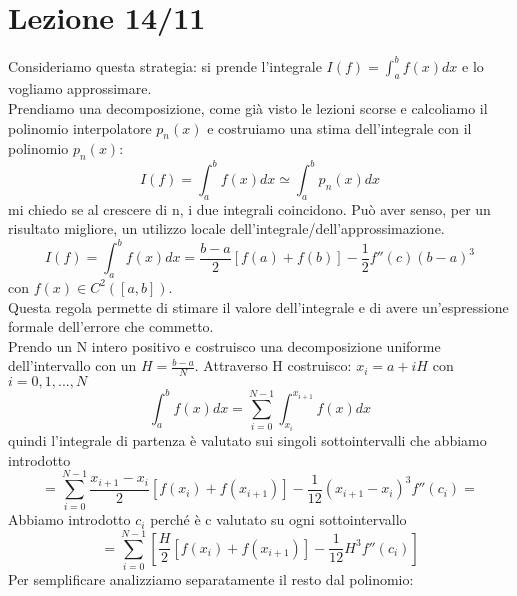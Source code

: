 \documentclass[a4paper, portrait]{book}
\numberwithin{equation}{chapter} %
\begin{document}
\chapter{Lezione 14/11}
Consideriamo questa strategia: si prende l'integrale $I(f) = \int_a^b f(x) dx$ e lo vogliamo approssimare.\\
Prendiamo una decomposizione, come già visto le lezioni scorse e calcoliamo il polinomio interpolatore $p_n(x)$ e costruiamo una stima dell'integrale con il polinomio $p_n(x)$:
\begin{equation}
    I(f) = \int_a^b f(x) dx \simeq \int_a^b p_n(x) dx
\end{equation}
mi chiedo se al crescere di n, i due integrali coincidono. Può aver senso, per un risultato migliore, un utilizzo locale dell'integrale/dell'approssimazione.\\
\begin{equation}
    I(f) = \int_a^b f(x) dx = \frac{b-a}{2}[f(a)+f(b)] - \frac{1}{2} f''(c) (b-a)^3
\end{equation}
con $f(x) \in C^2 ([a,b])$.\\
Questa regola permette di stimare il valore dell'integrale e di avere un'espressione formale dell'errore che commetto.\\
Prendo un N intero positivo e costruisco una decomposizione uniforme dell'intervallo con un $H = \frac{b-a}{N}$. Attraverso H costruisco: $x_i = a + iH$ con $i = 0,1,...,N$
\begin{equation}
    \int_a^b f(x) dx = \sum_{i=0}^{N-1} \int_{x_i}^{x_{i+1}} f(x) dx
\end{equation}
quindi l'integrale di partenza è valutato sui singoli sottointervalli che abbiamo introdotto
\begin{equation}
    = \sum_{i=0}^{N-1} \frac{x_{i+1}-x_i}{2} \left[f(x_i)+f(x_{i+1})\right] -\frac{1}{12}(x_{i+1}-x_i)^3 f''(c_i) =
\end{equation}
Abbiamo introdotto $c_i$ perché è c valutato su ogni sottointervallo
\begin{equation}
    = \sum_{i=0}^{N-1} \left[\frac{H}{2} \left[f(x_i)+f(x_{i+1})\right] - \frac{1}{12}H^3 f''(c_i)\right]
\end{equation}
Per semplificare analizziamo separatamente il resto dal polinomio:
\end{document}
